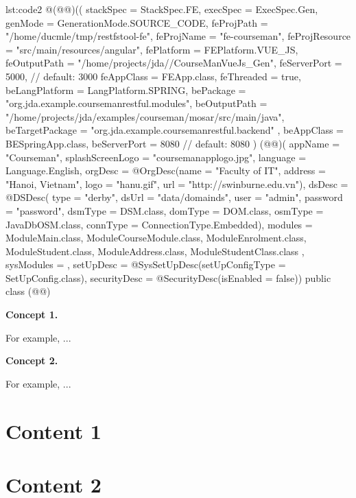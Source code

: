 \documentclass[runningheads]{llncs}
\begin{document}
\begin{lstcode}{}{lst:code2}
@(@@)((
  stackSpec = StackSpec.FE,
  execSpec = ExecSpec.Gen,
  genMode = GenerationMode.SOURCE_CODE,
  feProjPath = "/home/ducmle/tmp/restfstool-fe",
  feProjName = "fe-courseman",
  feProjResource = "src/main/resources/angular",
  fePlatform = FEPlatform.VUE_JS,
  feOutputPath = "/home/projects/jda//CourseManVueJs_Gen",
  feServerPort = 5000,  // default: 3000
  feAppClass = FEApp.class,
  feThreaded = true,
  beLangPlatform = LangPlatform.SPRING,
  bePackage = "org.jda.example.coursemanrestful.modules",
  beOutputPath = "/home/projects/jda/examples/courseman/mosar/src/main/java",
  beTargetPackage = "org.jda.example.coursemanrestful.backend"
  , beAppClass = BESpringApp.class,
  beServerPort = 8080  // default: 8080
)
(@@)(
  appName = "Courseman",
  splashScreenLogo = "coursemanapplogo.jpg",
  language = Language.English,
  orgDesc = @OrgDesc(name = "Faculty of IT",
          address = "Hanoi, Vietnam",
          logo = "hanu.gif",
          url = "http://swinburne.edu.vn"),
  dsDesc = @DSDesc(
          type = "derby",
          dsUrl = "data/domainds",
          user = "admin",
          password = "password",
          dsmType = DSM.class,
          domType = DOM.class,
          osmType = JavaDbOSM.class,
          connType = ConnectionType.Embedded),
  modules = {
          ModuleMain.class,
          ModuleCourseModule.class,
          ModuleEnrolment.class,
          ModuleStudent.class,
          ModuleAddress.class,
          ModuleStudentClass.class
  },
  sysModules = {},
  setUpDesc = @SysSetUpDesc(setUpConfigType = SetUpConfig.class),
  securityDesc = @SecurityDesc(isEnabled = false))
public class (@@) { }
\end{lstcode}

\textbf{Concept 1.}

For example, ...

\textbf{Concept 2.}

For example, ...

%
%
\section{Content 1} \label{sect:content1}

\section{Content 2} \label{sect:content2}
\end{document}
